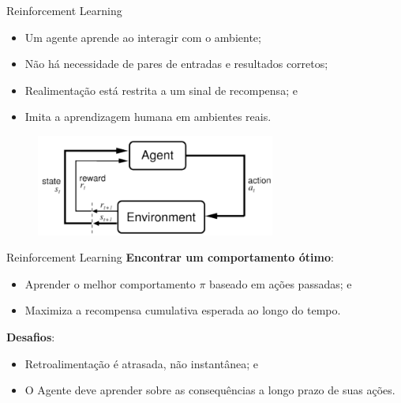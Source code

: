 \begin{frame}{Reinforcement Learning}
    \begin{itemize}
    \justifying
        \item Um agente aprende ao interagir com o ambiente;
        \item Não há necessidade de pares de entradas e resultados corretos;
        \item Realimentação está restrita a um sinal de recompensa; e
        \item Imita a aprendizagem humana em ambientes reais.
    \end{itemize}
    \begin{figure}
        \centering
        \includegraphics[width=0.7\textwidth]{img/rl.png}
        \label{fig:my_label}
    \end{figure}
\end{frame}

\begin{frame}{Reinforcement Learning}
    \textbf{Encontrar um comportamento ótimo}:
    \begin{itemize}
        \item Aprender o melhor comportamento $\pi$ baseado em ações passadas; e
        \item Maximiza a recompensa cumulativa esperada ao longo do tempo.
    \end{itemize}
    \textbf{Desafios}:
    \begin{itemize}
        \item Retroalimentação é atrasada, não instantânea; e
        \item O Agente deve aprender sobre as consequências a longo prazo de suas ações.
    \end{itemize}
\end{frame}

